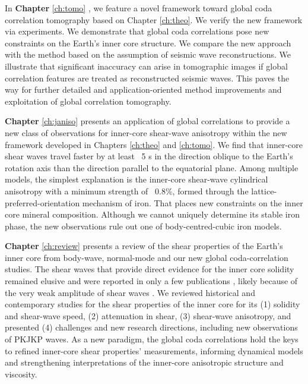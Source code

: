 In \textbf{Chapter} \ref{ch:tomo} \citep{wang2020seismictomo}, we feature a novel framework toward global coda correlation tomography based on Chapter \ref{ch:theo}. We verify the new framework via experiments. We demonstrate that global coda correlations pose new constraints on the Earth's inner core structure. We compare the new approach with the method based on the assumption of seismic wave reconstructions. We illustrate that significant inaccuracy can arise in tomographic images if global correlation features are treated as reconstructed seismic waves. This paves the way for further detailed and application-oriented method improvements and exploitation of global correlation tomography.

\textbf{Chapter} \ref{ch:janiso} \citep{wang_shear-wave_2021} presents an application of global correlations to provide a new class of observations for inner-core shear-wave anisotropy within the new framework developed in Chapters \ref{ch:theo} and \ref{ch:tomo}. We find that inner-core shear waves travel faster by at least ~5 s in the direction oblique to the Earth's rotation axis than the direction parallel to the equatorial plane. Among multiple models, the simplest explanation is the inner-core shear-wave cylindrical anisotropy with a minimum strength of ~0.8\%, formed through the lattice-preferred-orientation mechanism of iron. That places new constraints on the inner core mineral composition. Although we cannot uniquely determine its stable iron phase, the new observations rule out one of body-centred-cubic iron models.

\textbf{Chapter} \ref{ch:review} \citep*{tkalvcic2022shear} presents a review of the shear properties of the Earth's inner core from body-wave, normal-mode and our new global coda-correlation studies. The shear waves that provide direct evidence for the inner core solidity remained elusive and were reported in only a few publications 
\citep{julian_pkjkp_1972,okal_detection_1998,deuss_observation_2000,cao_observation_2005,wookey_inner-core_2008}, likely because of the very weak amplitude of shear waves 
\citep{shearer_visibility_2011}. We reviewed historical and contemporary studies for the shear properties of the inner core for its (1) solidity and shear-wave speed, (2) attenuation in shear, (3) shear-wave anisotropy, and presented (4) challenges and new research directions, including new observations of PKJKP waves. As a new paradigm, the global coda correlations hold the keys to refined inner-core shear properties' measurements, informing dynamical models and strengthening interpretations of the inner-core anisotropic structure and viscosity.

